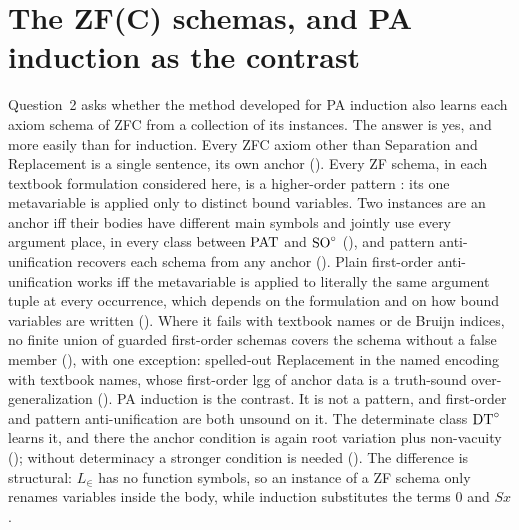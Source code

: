 \section{The ZF(C) schemas, and PA induction as the contrast}\label{sec:zf}
\providecommand{\zfN}[1]{\textup{(N$_{#1}$)}}
\providecommand{\zfR}[1]{\textup{(R$_{#1}$)}}
\providecommand{\zfB}{\textup{(B)}}
\providecommand{\zfDpat}[1]{\textup{(D$^{\mathrm{PAT}}_{#1}$)}}
\providecommand{\zfDdt}[1]{\textup{(D$^{\mathrm{DT}}_{#1}$)}}
\providecommand{\zfDroot}[1]{\textup{(D$^{\mathrm{root}}_{#1}$)}}
\providecommand{\zfLinf}{L_{\infty}}

Question~2 asks whether the method developed for PA induction also learns each axiom schema of ZFC from a
collection of its instances. The answer is yes, and more easily than for induction. Every ZFC axiom other than
Separation and Replacement is a single sentence, its own anchor (). Every ZF schema, in each
textbook formulation considered here, is a higher-order pattern \citep{miller1991logic}: its one metavariable is
applied only to distinct bound variables. Two instances are an anchor iff their bodies have different main symbols and
jointly use every argument place, in every class between $\mathrm{PAT}$ and $\mathrm{SO}^{\circ}$ (), and pattern
anti-unification recovers each schema from any anchor (). Plain first-order anti-unification works
iff the metavariable is applied to literally the same argument tuple at every occurrence, which depends on the
formulation and on how bound variables are written (). Where it fails with textbook names or de
Bruijn indices, no finite union of guarded first-order schemas covers the schema without a false member
(), with one exception: spelled-out Replacement in the named encoding with textbook names, whose
first-order lgg of anchor data is a truth-sound over-generalization (). PA induction is the contrast. It is not a pattern, and first-order and pattern anti-unification
are both unsound on it. The determinate class $\mathrm{DT}^{\circ}$ learns it, and there the anchor condition is again root variation
plus non-vacuity (); without determinacy a stronger condition is needed
(). The difference is structural: $L_\in$ has no function symbols, so an instance of a ZF schema
only renames variables inside the body, while induction substitutes the terms $0$ and $Sx$.

